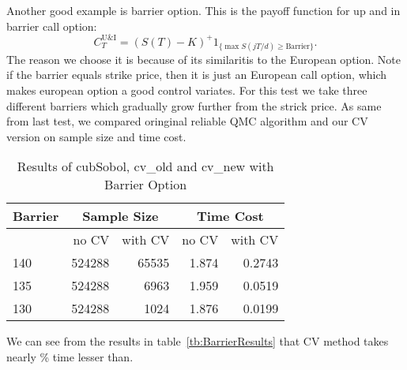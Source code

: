 Another good example is barrier option. This is the payoff function for up and in barrier call option:
\[ C_{T}^{\mathrm{U\&I}} = (S(T)-K)^+1_{ \{\max{S(jT/d)}\geq \mathrm{Barrier}\}}.\]
The reason we choose it is because of its similaritis to the European option. 
Note if the barrier equals strike price, then it is just an European call option, which makes european option a good control variates. 
For this test we take three different barriers which gradually grow further from the strick price. 
As same from last test, we compared oringinal reliable QMC algorithm and our CV version on sample size and time cost. 
\begin{table}[h]
    \centering
    \label{tb:}
	\caption{Results of cubSobol, cv\_old and cv\_new with Barrier Option}
    \begin{tabular}{lrrrr}
    \hline\hline
	Barrier &\multicolumn{2}{c}{Sample Size}
		&\multicolumn{2}{c}{Time Cost} \\
    \hline
	&no CV&with CV
    &no CV&with CV\\[0.5ex]
    \hline
	140  & 524288& 65535
	     & 1.874&0.2743 \\ 
	135  & 524288&6963
	     & 1.959&0.0519 \\ 
	130  & 524288&1024
    & 1.876& 0.0199 \\[1ex]
    \hline
	\end{tabular}
\end{table}
We can see from the results in table~\ref{tb:BarrierResults} that CV method takes nearly \% time lesser than.
